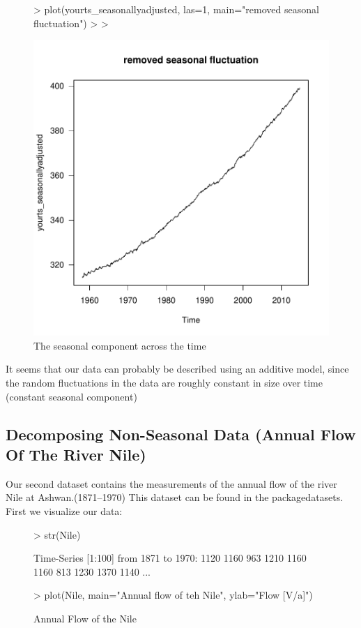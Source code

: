 \documentclass[11pt, a4paper]{article} %
\begin{document}
\begin{figure}[H]
\begin{Schunk}
\begin{Sinput}
> plot(yourts_seasonallyadjusted, las=1, main="removed seasonal fluctuation")
> 
> 
\end{Sinput}
\end{Schunk}
\includegraphics{sweaveclean-notseasonallyadjusted}
\caption{The seasonal component across the time}
\label{decomposition}
\end{figure}


\noindent It seems that our data can probably be described using an additive model, since the random fluctuations in the data are roughly constant in size over time (constant seasonal component)

\subsection{Decomposing Non-Seasonal Data (Annual Flow Of The River Nile)}

Our second dataset contains the measurements of the annual flow of the river Nile at Ashwan.(1871–1970) This dataset can be found in the package{datasets}. \\

\noindent First we visualize our data:\\
\begin{figure}[H]
\centering
\begin{Schunk}
\begin{Sinput}
> str(Nile)
\end{Sinput}
\begin{Soutput}
 Time-Series [1:100] from 1871 to 1970: 1120 1160 963 1210 1160 1160 813 1230 1370 1140 ...
\end{Soutput}
\begin{Sinput}
> plot(Nile, main="Annual flow of teh Nile", ylab="Flow [V/a]")
\end{Sinput}
\end{Schunk}
\caption{Annual Flow of the Nile}
\end{figure}
\end{document}
